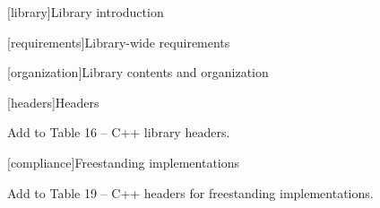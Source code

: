 
[library]{Library introduction}

\setcounter{section}{4}

[requirements]{Library-wide requirements}

[organization]{Library contents and organization}

\setcounter{subsubsection}{1}

[headers]{Headers}

\pnum
Add  to Table 16 -- C++ library headers.

[compliance]{Freestanding implementations}

Add  to Table 19 -- C++ headers for freestanding implementations.
